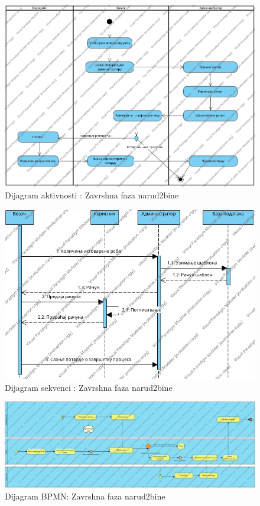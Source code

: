\begin{figure}[h!]
	\includegraphics[scale=0.4]{Slike/SUzavrsnaFazaPorudzbineActivity Diagram.jpg}
	\centering
	\caption{Dijagram aktivnosti : Zavrshna faza narud2bine}
	\label{ucZavrsnaFazaAktivnost}
\end{figure}
\begin{figure}[h!]
	\includegraphics[scale=0.4]{Slike/SUzavrsnaFazaProudzbineSequence Diagram1.jpg}
	\centering
	\caption{Dijagram sekvenci : Zavrshna faza narud2bine}
	\label{ucZavrsnaFazaSekvence}
\end{figure}
\begin{figure}[h!]
	\includegraphics[scale=0.25]{Slike/SUzavrsnaFazaPorudzbineBusiness Process Diagram1.jpg}
	\centering
	\caption{Dijagram BPMN: Zavrshna faza narud2bine}
	\label{ucZavrsnaFazaSekvence}
\end{figure}
